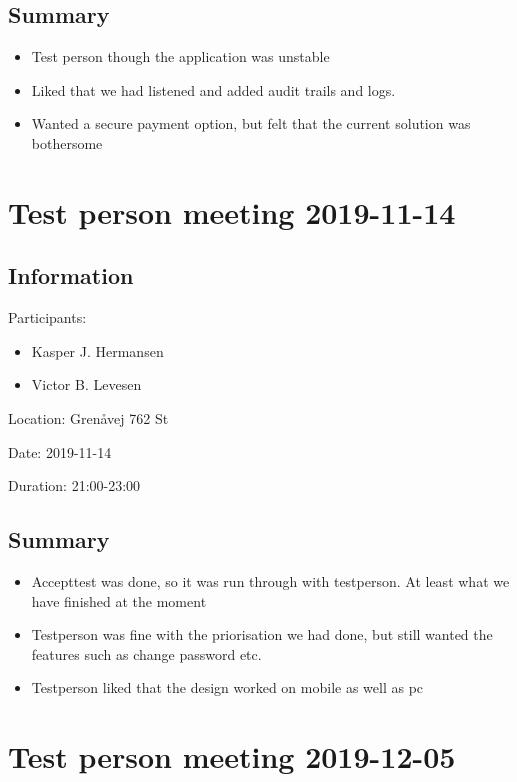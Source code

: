 \subsection{Summary}

\begin{itemize}
    \item Test person though the application was unstable
    \item Liked that we had listened and added audit trails and logs.
    \item Wanted a secure payment option, but felt that the current solution was bothersome
\end{itemize}

\newpage
\section{Test person meeting 2019-11-14}

\subsection{Information}
Participants:
\begin{itemize}
    \item Kasper J. Hermansen
    \item Victor B. Levesen
\end{itemize}

Location:
Grenåvej 762 St

Date:
2019-11-14

Duration:
21:00-23:00

\subsection{Summary}

\begin{itemize}
    \item Accepttest was done, so it was run through with testperson. At least what we have finished at the moment
    \item Testperson was fine with the priorisation we had done, but still wanted the features such as change password etc.
    \item Testperson liked that the design worked on mobile as well as pc
\end{itemize}

\newpage
\section{Test person meeting 2019-12-05}

